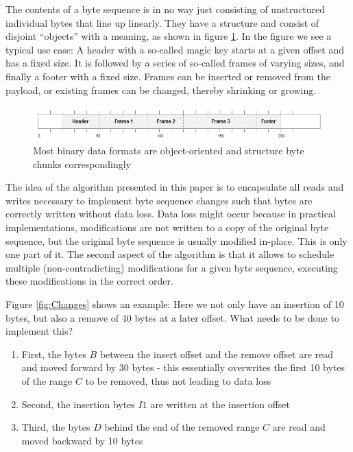 \documentclass[english, 10pt, openright, twocolumn, landscape, twoside, notitlepage, a4paper, pdftex]		
{article}
\begin{document}
The contents of a byte sequence is in no way just consisting of unstructured individual bytes that line up linearly. They have a structure and consist of disjoint ``objects'' with a meaning, as shown in figure \ref{fig:Objects}. In the figure we see a typical use case: A header with a so-called magic key starts at a given offset and has a fixed size. It is followed by a series of so-called frames of varying sizes, and finally a footer with a fixed size. Frames can be inserted or removed from the payload, or existing frames can be changed, thereby shrinking or growing.

\begin{figure}[htbp]
\centering
\includegraphics[width=1.00\columnwidth]{figures/Objects.png}
\caption{Most binary data formats are object-oriented and structure byte chunks correspondingly}
\label{fig:Objects}
\end{figure}

The idea of the algorithm presented in this paper is to encapsulate all reads and writes necessary to implement byte sequence changes such that bytes are correctly written without data loss. Data loss might occur because in practical implementations, modifications are not written to a copy of the original byte sequence, but the original byte sequence is usually modified in-place. This is only one part of it. The second aspect of the algorithm is that it allows to schedule multiple (non-contradicting) modifications for a given byte sequence, executing these modifications in the correct order.

Figure \ref{fig:Changes} shows an example: Here we not only have an insertion of 10 bytes, but also a remove of 40 bytes at a later offset. What needs to be done to implement this?
\begin{enumerate}
\item First, the bytes $B$ between the insert offset and the remove offset are read and moved forward by 30 bytes - this essentially overwrites the first 10 bytes of the range $C$ to be removed, thus not leading to data loss
\item Second, the insertion bytes $I1$ are written at the insertion offset
\item Third, the bytes $D$ behind the end of the removed range $C$ are read and moved backward by 10 bytes
\end{enumerate}
\end{document}
